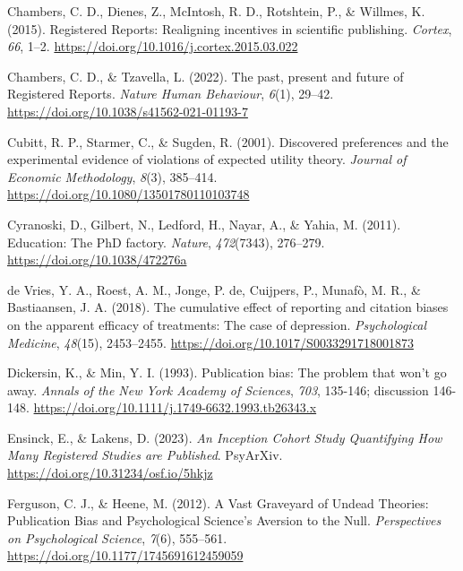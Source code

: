 \documentclass[
  ,man,mask,floatsintext]{apa6}
\newlength{\cslhangindent}
\newlength{\cslentryspacingunit} %
\newenvironment{CSLReferences}[2] %
 {%
  \setlength{\parindent}{0pt}
  \ifodd #1
  \let\oldpar\par
  \def\par{\hangindent=\cslhangindent\oldpar}
  \fi
  \setlength{\parskip}{#2\cslentryspacingunit}
 }%
 {}
\begin{document}
\begin{CSLReferences}{1}{0}
\leavevmode{}%
Chambers, C. D., Dienes, Z., McIntosh, R. D., Rotshtein, P., \& Willmes, K. (2015). Registered {Reports}: {Realigning} incentives in scientific publishing. \emph{Cortex}, \emph{66}, 1--2. \url{https://doi.org/10.1016/j.cortex.2015.03.022}

\leavevmode{}%
Chambers, C. D., \& Tzavella, L. (2022). The past, present and future of {Registered Reports}. \emph{Nature Human Behaviour}, \emph{6}(1), 29--42. \url{https://doi.org/10.1038/s41562-021-01193-7}

\leavevmode{}%
Cubitt, R. P., Starmer, C., \& Sugden, R. (2001). Discovered preferences and the experimental evidence of violations of expected utility theory. \emph{Journal of Economic Methodology}, \emph{8}(3), 385--414. \url{https://doi.org/10.1080/13501780110103748}

\leavevmode{}%
Cyranoski, D., Gilbert, N., Ledford, H., Nayar, A., \& Yahia, M. (2011). Education: {The PhD} factory. \emph{Nature}, \emph{472}(7343), 276--279. \url{https://doi.org/10.1038/472276a}

\leavevmode{}%
de Vries, Y. A., Roest, A. M., Jonge, P. de, Cuijpers, P., Munafò, M. R., \& Bastiaansen, J. A. (2018). The cumulative effect of reporting and citation biases on the apparent efficacy of treatments: The case of depression. \emph{Psychological Medicine}, \emph{48}(15), 2453--2455. \url{https://doi.org/10.1017/S0033291718001873}

\leavevmode{}%
Dickersin, K., \& Min, Y. I. (1993). Publication bias: The problem that won't go away. \emph{Annals of the New York Academy of Sciences}, \emph{703}, 135-146; discussion 146-148. \url{https://doi.org/10.1111/j.1749-6632.1993.tb26343.x}

\leavevmode{}%
Ensinck, E., \& Lakens, D. (2023). \emph{An {Inception Cohort Study Quantifying How Many Registered Studies} are {Published}}. PsyArXiv. \url{https://doi.org/10.31234/osf.io/5hkjz}

\leavevmode{}%
Ferguson, C. J., \& Heene, M. (2012). A {Vast Graveyard} of {Undead Theories}: {Publication Bias} and {Psychological Science}'s {Aversion} to the {Null}. \emph{Perspectives on Psychological Science}, \emph{7}(6), 555--561. \url{https://doi.org/10.1177/1745691612459059}


\end{CSLReferences}
\end{document}
